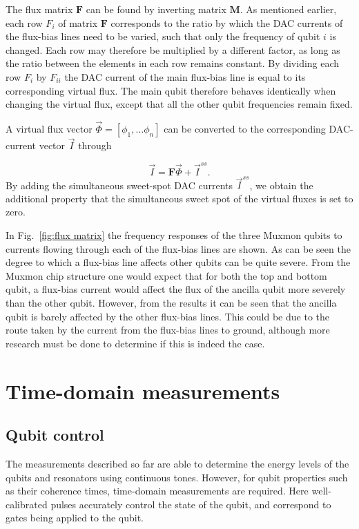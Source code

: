        The flux matrix $\boldsymbol{F}$ can be found by inverting matrix $\boldsymbol{M}$. As mentioned earlier, each row $F_i$ of matrix $\boldsymbol{F}$ corresponds to the ratio by which the DAC currents of the flux-bias lines need to be varied, such that only the frequency of qubit $i$ is changed. Each row may therefore be multiplied by a different factor, as long as the ratio between the elements in each row remains constant. By dividing each row $F_i$ by $F_{ii}$ the DAC current of the main flux-bias line is equal to its corresponding virtual flux. The main qubit therefore behaves identically when changing the virtual flux, except that all the other qubit frequencies remain fixed.

        A virtual flux vector $\vec{\Phi}=\left[ \phi_1, \dots \phi_n \right]$ can be converted to the corresponding DAC-current vector $\vec{I}$ through

        \begin{equation}
          \vec{I} = \boldsymbol{F} \vec{\Phi} + \vec{I}^{ss}.
        \end{equation}
        By adding the simultaneous sweet-spot DAC currents $\vec{I}^{ss}$, we obtain the additional property that the simultaneous sweet spot of the virtual fluxes is set to zero.

        In Fig.~\ref{fig:flux matrix} the frequency responses of the three Muxmon qubits to currents flowing through each of the flux-bias lines are shown. As can be seen the degree to which a flux-bias line affects other qubits can be quite severe. From the Muxmon chip structure one would expect that for both the top and bottom qubit, a flux-bias current would affect the flux  of the ancilla qubit more severely than the other qubit. However, from the results it can be seen that the ancilla qubit is barely affected by the other flux-bias lines. This could be due to the route taken by the current from the flux-bias lines to ground, although more research must be done to determine if this is indeed the case.

    \section{Time-domain measurements}
      \label{sec:Time-domain measurements}
      \subsection{Qubit control}
        \label{ssec:qubit control}
        The measurements described so far are able to determine the energy levels of the qubits and resonators using continuous tones. However, for qubit properties such as their coherence times, time-domain measurements are required. Here well-calibrated pulses accurately control the state of the qubit, and correspond to gates being applied to the qubit.

